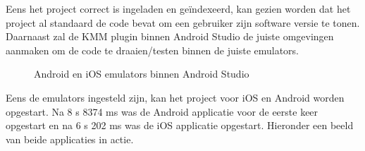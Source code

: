 Eens het project correct is ingeladen en geïndexeerd, kan gezien worden dat het project al standaard de code bevat om een gebruiker zijn software versie te tonen. Daarnaast zal de KMM plugin binnen Android Studio de juiste omgevingen aanmaken om de code te draaien/testen binnen de juiste emulators. 

\begin{figure}
    \centering
    
    
    \caption{Android en iOS emulators binnen Android Studio}
    \label{fig:M-as-emulators}
\end{figure}

Eens de emulators ingesteld zijn, kan het project voor iOS en Android worden opgestart. Na 8 s 8374 ms was de Android applicatie voor de eerste keer opgestart en na 6 s 202 ms was de iOS applicatie opgestart. Hieronder een beeld van beide applicaties in actie.

